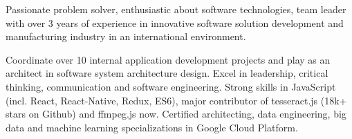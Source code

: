

\begin{cvparagraph}

Passionate problem solver, enthusiastic about software technologies, team leader with over 3 years of experience in innovative software solution development and manufacturing industry in an international environment.

Coordinate over 10 internal application development projects and play as an architect in software system architecture design. Excel in leadership, critical thinking, communication and software engineering. Strong skills in JavaScript (incl. React, React-Native, Redux, ES6), major contributor of tesseract.js (18k+ stars on Github) and ffmpeg.js now. Certified architecting, data engineering, big data and machine learning specializations in Google Cloud Platform. 
\end{cvparagraph}
